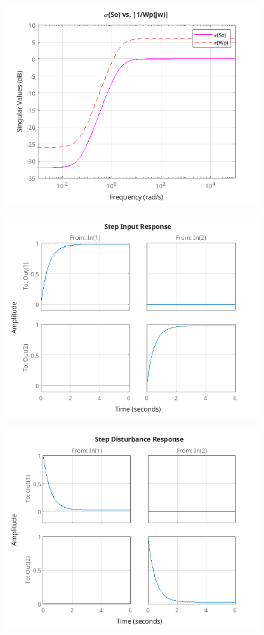 \documentclass{article}
\begin{document}
\begin{figure}[H]
    \centering
    \includegraphics[width=\textwidth]{a4SoWp.png}
\end{figure}

\begin{figure}[H]
    \centering
    \includegraphics[width=\textwidth]{a4stepInput.png}
\end{figure}

\begin{figure}[H]
    \centering
    \includegraphics[width=\textwidth]{a4disturbance.png}
\end{figure}
\end{document}
